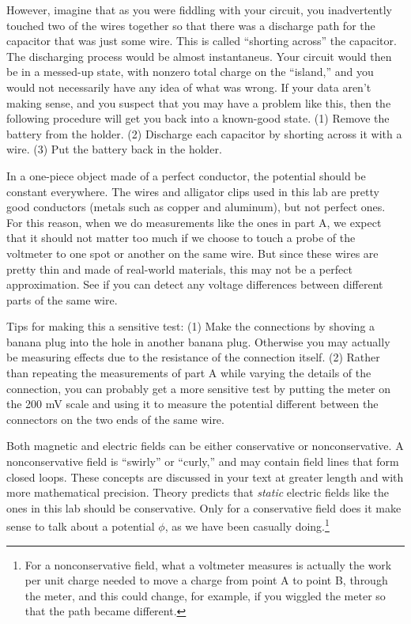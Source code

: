 
However, imagine that as you were fiddling
with your circuit, you inadvertently touched two of the wires together so that there was
a discharge path for the capacitor that was just some wire. This is called ``shorting across''
the capacitor. The discharging process would
be almost instantaneus. Your circuit would then be in a messed-up state, with nonzero total charge on the ``island,'' and you would
not necessarily have any idea of what was wrong. If your data aren't making sense, and
you suspect that you may have a problem like this, then the following procedure will get
you back into a known-good state. (1) Remove the battery from the holder. (2) Discharge each
capacitor by shorting across it with a wire. (3) Put the battery back in the holder.


In a one-piece object made of a perfect conductor, the potential should be constant everywhere.
The wires and alligator clips used in this lab are pretty good conductors (metals
such as copper and aluminum), but not perfect ones. For this reason, when we do
measurements like the ones in part A, we expect that it should
not matter too much if we choose to touch a probe of the voltmeter to one spot or another
on the same wire. But since these wires are pretty thin and made of real-world materials,
this may not be a perfect approximation. See if you can detect any voltage differences
between different parts of the same wire. 

Tips for making this a sensitive test: (1) Make the connections by shoving a banana plug into
the hole in another banana plug. Otherwise you may actually be measuring effects due to the
resistance of the connection itself. (2) Rather than repeating the measurements of
part A while varying the details of the connection, you can probably
get a more sensitive test by putting the meter on the 200 mV scale and using it to measure
the potential different between the connectors on the two ends of the same wire.


Both magnetic and electric fields can be either conservative or nonconservative.
A nonconservative field is ``swirly'' or ``curly,'' and may contain field lines
that form closed loops. These concepts are discussed in your text at greater length and
with more mathematical precision. Theory predicts that \emph{static} electric fields
like the ones in this lab should be conservative. Only for a conservative field does
it make sense to talk about a potential $\phi$, as we have been casually 
doing.\footnote{For a nonconservative field, what a voltmeter measures is actually the work
per unit charge needed to move a charge from point A to point B, through the meter, and this could
change, for example, if you wiggled the meter so that the path became different.}

